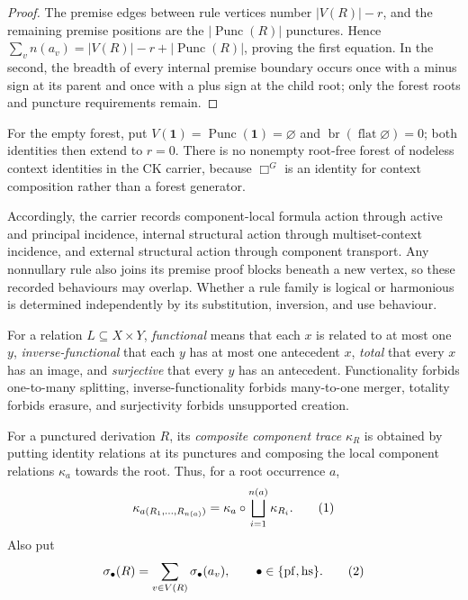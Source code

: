 \documentclass[10pt,a4paper]{article}
\theoremstyle{plain}
\theoremstyle{definition}
\theoremstyle{remark}
\newcommand{\one}{\mathbf 1}
\newcommand{\Punc}{\operatorname{Punc}}
\newcommand{\br}{\operatorname{br}}
\newcommand{\eqtag}{\refstepcounter{equation}\tag{\theequation}}
\begin{document}
\begin{proof}
The premise edges between rule vertices number \(|V(R)|-r\), and the
remaining premise positions are the \(|\Punc(R)|\) punctures.  Hence
\(\sum_v n(a_v)=|V(R)|-r+|\Punc(R)|\), proving the first equation.  In the
second, the breadth of every internal premise boundary occurs once with a
minus sign at its parent and once with a plus sign at the child root; only
the forest roots and puncture requirements remain.
\end{proof}

For the empty forest, put
\(V(\one)=\Punc(\one)=\varnothing\) and
\(\br(\operatorname{flat}\varnothing)=0\); both identities then extend
to \(r=0\).  There is no nonempty root-free forest of nodeless context
identities in the CK carrier, because \(\Box^G\) is an identity for context
composition rather than a forest generator.

Accordingly, the carrier records component-local formula action through
active and principal incidence, internal structural action through
multiset-context incidence, and external structural action through
component transport.  Any nonnullary rule also joins its premise proof
blocks beneath a new vertex, so these recorded behaviours may overlap.
Whether a rule family is logical or harmonious is determined independently
by its substitution, inversion, and use behaviour.

For a relation \(L\subseteq X\times Y\), \emph{functional} means that each
\(x\) is related to at most one \(y\), \emph{inverse-functional} that each
\(y\) has at most one antecedent \(x\), \emph{total} that every \(x\) has
an image, and \emph{surjective} that every \(y\) has an antecedent.
Functionality forbids one-to-many splitting, inverse-functionality forbids
many-to-one merger, totality forbids erasure, and surjectivity forbids
unsupported creation.

For a punctured derivation \(R\), its \emph{composite component trace}
\(\kappa_R\) is obtained by putting identity relations at its punctures
and composing the local component relations \(\kappa_a\) towards the root.
Thus, for a root occurrence \(a\),
\[
 \kappa_{a(R_1,\ldots,R_{n(a)})}
   =\kappa_a\circ\bigsqcup_{i=1}^{n(a)}\kappa_{R_i}.
\eqtag\label{eq:structural-trace-recursion}
\]
Also put
\[
 \sigma_\bullet(R)=\sum_{v\in V(R)}
       \sigma_\bullet(a_v),
 \qquad
 \bullet\in\{\mathrm{pf},\mathrm{hs}\}.
\eqtag\label{eq:composite-scalar-defect}
\]
\end{document}
